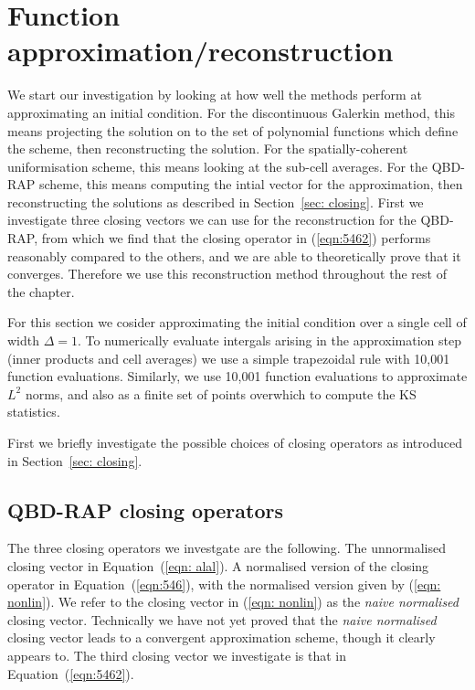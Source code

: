 


	




\section{Function approximation/reconstruction}
We start our investigation by looking at how well the methods perform at approximating an initial condition. For the discontinuous Galerkin method, this means projecting the solution on to the set of polynomial functions which define the scheme, then reconstructing the solution. For the spatially-coherent uniformisation scheme, this means looking at the sub-cell averages. For the QBD-RAP scheme, this means computing the intial vector for the approximation, then reconstructing the solutions as described in Section~\ref{sec: closing}. First we investigate three closing vectors we can use for the reconstruction for the QBD-RAP, from which we find that the closing operator in (\ref{eqn:5462}) performs reasonably compared to the others, and we are able to theoretically prove that it converges. Therefore we use this reconstruction method throughout the rest of the chapter.

For this section we cosider approximating the initial condition over a single cell of width \(\Delta = 1\). To numerically evaluate intergals arising in the approximation step (inner products and cell averages) we use a simple trapezoidal rule with 10,001 function evaluations. Similarly, we use 10,001 function evaluations to approximate \(L^2\) norms, and also as a finite set of points overwhich to compute the KS statistics. 

First we briefly investigate the possible choices of closing operators as introduced in Section~\ref{sec: closing}. 

\subsection{QBD-RAP closing operators}
The three closing operators we investgate are the following. The unnormalised closing vector in Equation~(\ref{eqn: alal}). A normalised version of the closing operator in Equation~(\ref{eqn:546}), with the normalised version given by (\ref{eqn: nonlin}). We refer to the closing vector in (\ref{eqn: nonlin}) as the \emph{naive normalised} closing vector. Technically we have not yet proved that the \emph{naive normalised} closing vector leads to a convergent approximation scheme, though it clearly appears to. The third closing vector we investigate is that in Equation~(\ref{eqn:5462}). 

